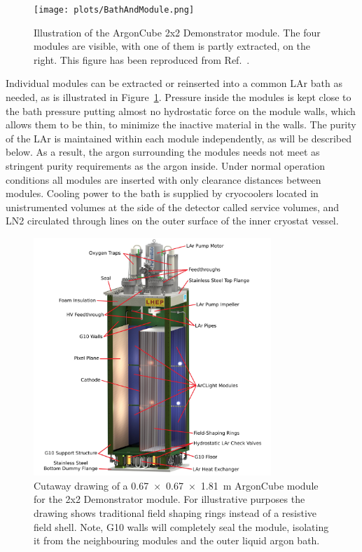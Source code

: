 \begin{figure}[htbp]
\centering
\texttt{[image: plots/BathAndModule.png]}
\caption{Illustration of the ArgonCube 2x2 Demonstrator module. The four modules are visible, with one of them is partly extracted, on the right. This figure has been reproduced from Ref.~\cite{argoncube_loi}.}
\label{fig:2x2_extraction}
\end{figure}

Individual modules can be extracted or reinserted into a common LAr bath as needed, as is illustrated in Figure~\ref{fig:2x2_extraction}. Pressure inside the modules is kept close to the bath pressure putting almost no hydrostatic force on the module walls, which allows them to be thin, to minimize the inactive material in the walls. The purity of the LAr is maintained within each module independently, as will be described below. As a result, the argon surrounding the modules needs not meet as stringent purity requirements as the argon inside. Under normal operation conditions all modules are inserted with only clearance distances between modules. Cooling power to the bath is supplied by cryocoolers located in unistrumented volumes at the side of the detector called service volumes, and LN2 circulated through lines on the outer surface of the inner cryostat vessel.

\begin{figure}[tbp]
  \centering
  \includegraphics[width=0.8\textwidth]{plots/Normal-Module-4K_labelled}
  \caption[ArgonCube module engineering drawing]{Cutaway drawing of a \SI{0.67 x 0.67 x 1.81}{\metre} ArgonCube module for the 2x2 Demonstrator module. For illustrative purposes the drawing shows traditional field shaping rings instead of a resistive field shell. Note, G10 walls will completely seal the module, isolating it from the neighbouring modules and the outer liquid argon bath.}
  \label{fig:ac_module}
\end{figure}

